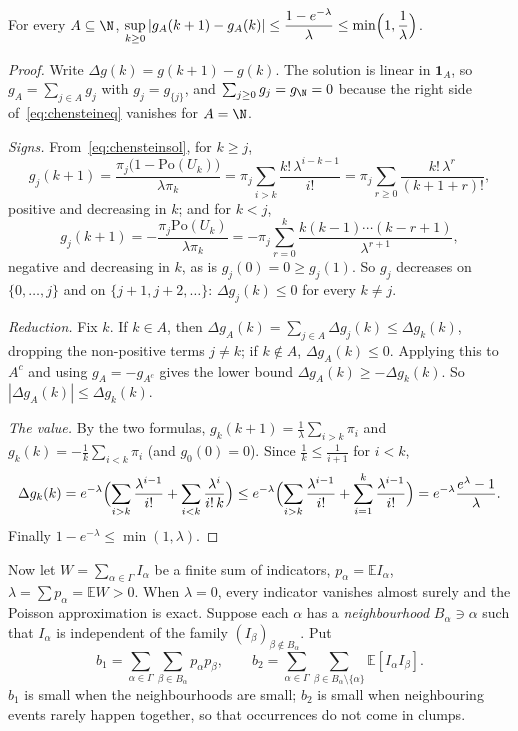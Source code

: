 \begin{lemma}\label{lem:chensteinsol}
For every $A\subseteq\N$, $\displaystyle\sup_{k\ge0}|g_A(k+1)-g_A(k)|\le\frac{1-e^{-\lambda}}\lambda\le\min\Bigl(1,\frac1\lambda\Bigr)$.
\end{lemma}
\begin{proof}
Write $\Delta g(k)=g(k+1)-g(k)$. The solution is linear in $\mathbf 1_A$, so $g_A=\sum_{j\in A}g_j$ with $g_j=g_{\{j\}}$, and $\sum_{j\ge0}g_j=g_\N=0$ because
the right side of~\eqref{eq:chensteineq} vanishes for $A=\N$.

\emph{Signs.} From~\eqref{eq:chensteinsol}, for $k\ge j$,
\[
g_j(k+1)=\frac{\pi_j\bigl(1-\mathrm{Po}(U_k)\bigr)}{\lambda\pi_k}=\pi_j\sum_{i>k}\frac{k!\,\lambda^{i-k-1}}{i!}=\pi_j\sum_{r\ge0}\frac{k!\,\lambda^r}{(k+1+r)!},
\]
positive and decreasing in $k$; and for $k<j$,
\[
g_j(k+1)=-\frac{\pi_j\mathrm{Po}(U_k)}{\lambda\pi_k}=-\pi_j\sum_{r=0}^k\frac{k(k-1)\cdots(k-r+1)}{\lambda^{r+1}},
\]
negative and decreasing in $k$, as is $g_j(0)=0\ge g_j(1)$. So $g_j$ decreases on $\{0,\dots,j\}$ and on $\{j+1,j+2,\dots\}$: $\Delta g_j(k)\le0$ for every $k\ne j$.

\emph{Reduction.} Fix $k$. If $k\in A$, then $\Delta g_A(k)=\sum_{j\in A}\Delta g_j(k)\le\Delta g_k(k)$, dropping the non-positive terms $j\ne k$; if $k\notin A$,
$\Delta g_A(k)\le0$. Applying this to $A^c$ and using $g_A=-g_{A^c}$ gives the lower bound $\Delta g_A(k)\ge-\Delta g_k(k)$. So $|\Delta g_A(k)|\le\Delta g_k(k)$.

\emph{The value.} By the two formulas, $g_k(k+1)=\frac1\lambda\sum_{i>k}\pi_i$ and $g_k(k)=-\frac1k\sum_{i<k}\pi_i$ (and $g_0(0)=0$). Since $\frac1k\le\frac1{i+1}$ for $i<k$,
\[
\Delta g_k(k)=e^{-\lambda}\Bigl(\sum_{i>k}\frac{\lambda^{i-1}}{i!}+\sum_{i<k}\frac{\lambda^i}{i!\,k}\Bigr)\le e^{-\lambda}\Bigl(\sum_{i>k}\frac{\lambda^{i-1}}{i!}+\sum_{i=1}^{k}\frac{\lambda^{i-1}}{i!}\Bigr)
=e^{-\lambda}\frac{e^\lambda-1}\lambda.
\]
Finally $1-e^{-\lambda}\le\min(1,\lambda)$.
\end{proof}

Now let $W=\sum_{\alpha\in\Gamma}I_\alpha$ be a finite sum of indicators, $p_\alpha=\mathbb EI_\alpha$, $\lambda=\sum p_\alpha=\mathbb EW>0$. When $\lambda=0$, every indicator vanishes almost surely and the Poisson approximation is exact. Suppose each $\alpha$ has a
\emph{neighbourhood} $B_\alpha\ni\alpha$ such that $I_\alpha$ is independent of the family $(I_\beta)_{\beta\notin B_\alpha}$. Put
\[
b_1=\sum_{\alpha\in\Gamma}\sum_{\beta\in B_\alpha}p_\alpha p_\beta,\qquad b_2=\sum_{\alpha\in\Gamma}\sum_{\beta\in B_\alpha\setminus\{\alpha\}}\mathbb E[I_\alpha I_\beta].
\]
$b_1$ is small when the neighbourhoods are small; $b_2$ is small when neighbouring events rarely happen together, so that occurrences do not come in clumps.

